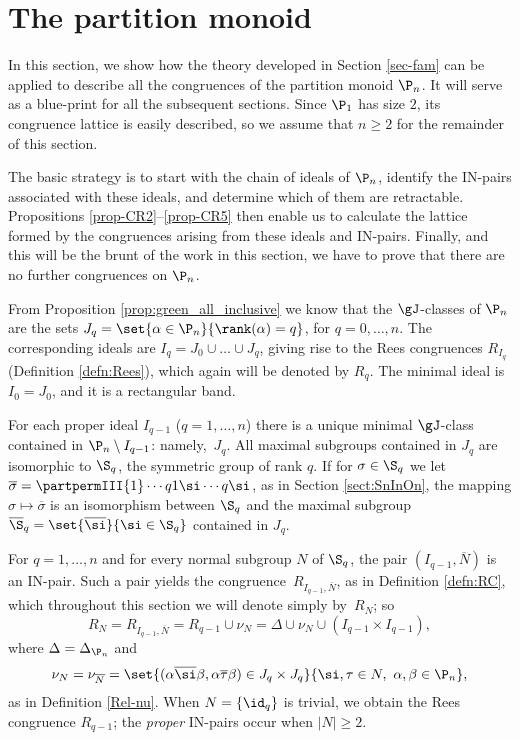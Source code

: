 \section{The partition monoid }
\label{sec:Pn}

In this section, we show how the theory developed in Section \ref{sec-fam} can be applied to describe all the congruences of the partition monoid $\P_n$.
It will serve as a blue-print for all the subsequent sections.  Since $\P_1$ has size $2$, its congruence lattice is easily described, so we assume that $n\geq2$ for the remainder of this section.

The basic strategy is to start with the chain of ideals of $\P_n$,
identify the IN-pairs associated with these ideals, and determine which of them are retractable.
Propositions \ref{prop-CR2}--\ref{prop-CR5} then enable us to calculate the lattice formed by the congruences arising from these ideals and IN-pairs. Finally, and this will be the brunt of the work in this section, we have to prove that there are no further congruences on $\P_n$.

From Proposition \ref{prop:green_all_inclusive} we know that the $\gJ$-classes of $\P_n$ are the sets
$J_q=\set{\alpha\in\P_n}{\rank(\alpha)=q}$, for $q=0,\dots,n$.
The corresponding ideals are $I_q=J_0\cup\dots\cup J_q$,
giving rise to the Rees congruences $R_{I_q}$ (Definition \ref{defn:Rees}), which again will be denoted by $R_q$.
The minimal ideal is $I_0=J_0$, and it is a rectangular band.

For each proper ideal $I_{q-1}$ ($q=1,\dots,n$) there is a unique minimal $\gJ$-class
contained in $\P_n\setminus I_{q-1}$: namely,~$J_{q}$. All maximal subgroups contained in $J_q$ are isomorphic to $\S_q$, the symmetric group of rank $q$.
If for $\sigma\in\S_q$ we let
$\overline{\sigma}=\partpermIII{1}\cdots{q}{{1\si}}\cdots{{q\si}}$, as in Section \ref{sect:SnInOn}, the mapping $\sigma\mapsto \overline{\sigma}$ is an isomorphism between $\S_q$ and the maximal subgroup $\overline{\S}_q=\set{\overline\si}{\si\in\S_q}$ contained in $J_q$.

For $q=1,\ldots,n$ and for every normal subgroup $N$ of $\S_q$, the pair $(I_{q-1},\overline{N})$ is an IN-pair. Such a pair yields the congruence~$R_{I_{q-1},\overline N}$, as in Definition \ref{defn:RC}, which throughout this section we will denote simply by~$R_N$; so
\[
R_N=R_{I_{q-1},\overline N} = R_{q-1}\cup\nu_N=\Delta\cup \nu_{N}\cup (I_{q-1}\times I_{q-1}),
\]
where $\Delta=\Delta_{\P_n}$ and
\[
\nu_{N}=\nu_{\overline N}=\set{ (\alpha\overline\si\beta,\alpha\overline\tau\beta)\in J_q\times J_q}{\si,\tau\in N,\ \alpha,\beta\in\P_n},
\]
as in Definition \ref{Rel-nu}.
When $N=\{\id_q\}$ is trivial, we obtain the Rees congruence $R_{q-1}$; the \emph{proper} IN-pairs occur when $|N|\geq2$.







